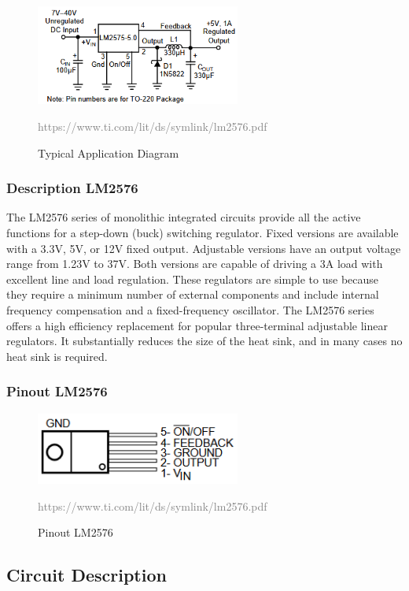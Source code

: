 \begin{figure}[h]
\centering
\includegraphics[width=0.6\textwidth]{assets/LM2576 Application.png}
\caption{Typical Application Diagram}
\textcolor{gray}{https://www.ti.com/lit/ds/symlink/lm2576.pdf}
\label{fig:Typical Application Diagram}
\end{figure}

\subsubsection{Description LM2576}
The LM2576 series of monolithic integrated circuits provide
all the active functions for a step-down (buck) switching
regulator. Fixed versions are available with a 3.3V, 5V, or 12V
fixed output. Adjustable versions have an output voltage
range from 1.23V to 37V. Both versions are capable of driving
a 3A load with excellent line and load regulation.
These regulators are simple to use because they require a
minimum number of external components and include internal
frequency compensation and a fixed-frequency oscillator.
The LM2576 series offers a high efficiency replacement for
popular three-terminal adjustable linear regulators. It
substantially reduces the size of the heat sink, and in many
cases no heat sink is required.

\subsubsection{Pinout LM2576}
\begin{figure}[h]
\centering
\includegraphics[width=0.6\textwidth]{assets/Pinout.png}
\caption{Pinout LM2576}
\textcolor{gray}{https://www.ti.com/lit/ds/symlink/lm2576.pdf}
\label{fig:Pinout LM2576}
\end{figure}

\subsection{Circuit Description}
